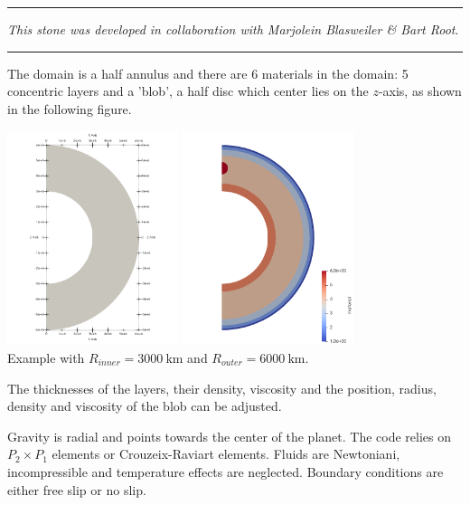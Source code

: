 \par\noindent\rule{\textwidth}{0.4pt}

{\sl This stone was developed in collaboration with Marjolein Blasweiler \& Bart Root}. 
 

\par\noindent\rule{\textwidth}{0.4pt}


The domain is a half annulus and there are 6 materials in the domain: 
5 concentric layers and a 'blob', a half disc which center lies on the $z$-axis,  
as shown in the following figure.
\begin{center}
\includegraphics[width=5cm]{python_codes/fieldstone_96/images/domain}
\includegraphics[width=5cm]{python_codes/fieldstone_96/images/domain2}\\
{\captionfont Example with $R_{inner}=3000~\si{\km}$ and $R_{outer}=6000~\si{\km}$.}
\end{center}
The thicknesses of the layers, their density, viscosity and the position, radius, density and viscosity 
of the blob can be adjusted. 

Gravity is radial and points towards the center of the planet. 
The code relies on $P_2\times P_1$ elements or Crouzeix-Raviart elements. 
Fluids are Newtoniani, incompressible and 
temperature effects are neglected. 
Boundary conditions are either free slip or no slip.

